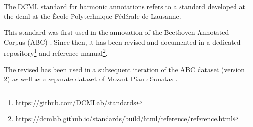 

The DCML standard for harmonic annotations refers to a
standard developed at the \gls{dcml} at the \'Ecole
Polytechnique F\'ed\'erale de Lausanne.

This standard was first used in the annotation of the
Beethoven Annotated Corpus (ABC)
\parencite{neuwirth2018annotated}. Since then, it has been
revised and documented in a dedicated
repository\footnote{\href{https://github.com/DCMLab/standards}{https://github.com/DCMLab/standards}}
and reference
manual\footnote{\href{https://dcmlab.github.io/standards/build/html/reference/reference.html}{https://dcmlab.github.io/standards/build/html/reference/reference.html}}.

The revised has been used in a subsequent iteration of the
ABC dataset (version 2) as well as a separate dataset of
Mozart Piano Sonatas \parencite{hentschel2021annotated}.
